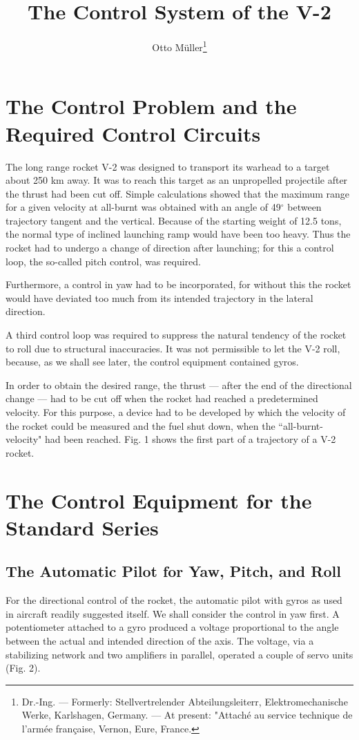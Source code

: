 \documentclass[12pt, a4paper]{article}
\title{The Control System of the V-2}
\author{Otto Müller\footnote{Dr.-Ing. — Formerly: Stellvertrelender Abteilungsleiterr, Elektromechanische Werke, Karlshagen, Germany. — At present: "Attaché au service technique de l'armée française, Vernon, Eure, France.}}
\date{}
\begin{document}
\maketitle
\tableofcontents

\newpage
\section{The Control Problem and the Required Control Circuits}

The long range rocket V-2 was designed to transport its warhead to a target about 250 km away. It was to reach this target as an unpropelled projectile after the thrust had been cut off. Simple calculations showed that the maximum range for a given velocity at all-burnt was obtained with an angle of 49$^\circ$ between trajectory tangent and the vertical. Because of the starting weight of 12.5 tons, the normal type of inclined launching ramp would have been too heavy. Thus the rocket had to undergo a change of direction after launching; for this a control loop, the so-called pitch control, was required.

Furthermore, a control in yaw had to be incorporated, for without this the rocket would have deviated too much from its intended trajectory in the lateral direction.

A third control loop was required to suppress the natural tendency of the rocket to roll due to structural inaccuracies. It was not permissible to let the V-2 roll, because, as we shall see later, the control equipment contained gyros.

In order to obtain the desired range, the thrust — after the end of the directional change — had to be cut off when the rocket had reached a predetermined velocity. For this purpose, a device had to be developed by which the velocity of the rocket could be measured and the fuel shut down, when the ``all-burnt-velocity" had been reached. Fig. 1 shows the first part of a trajectory of a V-2 rocket.

\section{The Control Equipment for the Standard Series}

\subsection{The Automatic Pilot for Yaw, Pitch, and Roll}

For the directional control of the rocket, the automatic pilot with gyros as used in aircraft readily suggested itself. We shall consider the control in yaw first. A potentiometer attached to a gyro produced a voltage proportional to the angle between the actual and intended direction of the axis. The voltage, via a stabilizing network and two amplifiers in parallel, operated a couple of servo units (Fig. 2).
\end{document}
